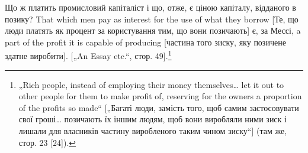 Що ж платить промисловий капіталіст і що, отже, є ціною
капіталу, відданого в позику? That which men pay as interest for
the use of what they borrow [Те, що люди платять як процент за
користування тим, що вони позичають] є, за Мессі, a part of the
profit it is capable of producing [частина того зиску, яку позичене
здатне виробити]. [„An Essay etc.“, стор. 49].\footnote{
„Rich people, instead of employing their money themselves\dots{} let it out to
other people for them to make profit of, reserving for the owners a proportion of
the profits so made“ [„Багаті люди, замість того, щоб самим застосовувати свої
гроші\dots{} позичають їх іншим людям, щоб вони виробляли ними зиск і лишали для
власників частину виробленого таким чином зиску“] (там же, стор. 23 [24]).
}
